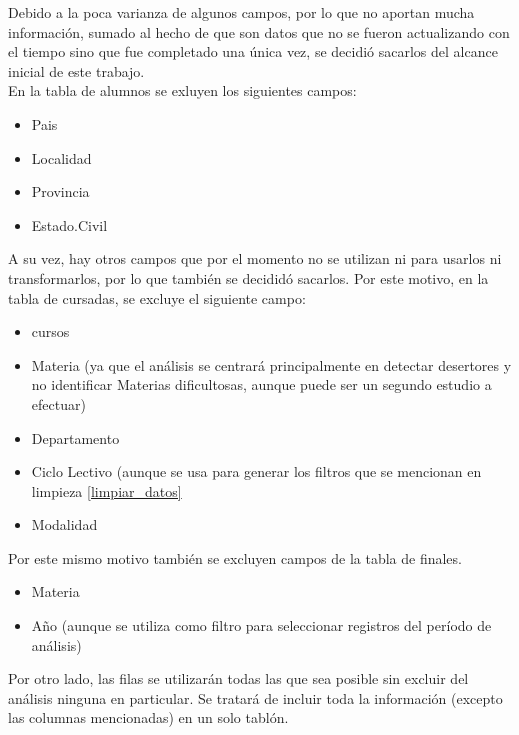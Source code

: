 
Debido a la poca varianza de algunos campos, por lo que no aportan mucha información, sumado al hecho de que son datos que no se fueron actualizando con el tiempo sino que fue completado una única vez, se decidió sacarlos del alcance inicial de este trabajo.\\

En la tabla de alumnos se exluyen los siguientes campos:
\begin{itemize}
\item Pais
\item Localidad
\item Provincia
\item Estado.Civil
\end{itemize}

A su vez, hay otros campos que por el momento no se utilizan ni para usarlos ni transformarlos, por lo que también se decididó sacarlos.
Por este motivo, en la tabla de cursadas, se excluye el siguiente campo:
\begin{itemize}
	\item cursos
	\item Materia (ya que el análisis se centrará principalmente en detectar desertores y no identificar Materias dificultosas, aunque puede ser un segundo estudio a efectuar)
	\item Departamento
	\item Ciclo Lectivo (aunque se usa para generar los filtros que se mencionan en limpieza \ref{limpiar_datos}
	\item Modalidad
\end{itemize}

Por este mismo motivo también se excluyen campos de la tabla de finales.
\begin{itemize}
	\item Materia
	\item Año (aunque se utiliza como filtro para seleccionar registros del período de análisis)
\end{itemize}

Por otro lado, las filas se utilizarán todas las que sea posible sin excluir del análisis ninguna en particular. Se tratará de incluir toda la información (excepto las columnas mencionadas) en un solo tablón.


